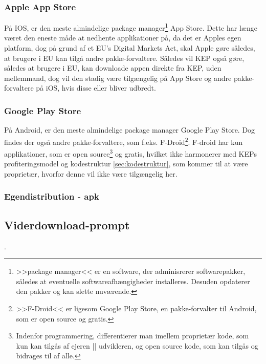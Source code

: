 \subsubsection{Apple App Store}
På IOS, er den meste almindelige package manager\footnote{>>package manager<< er en software, der adminisrerer softwarepakker, således at eventuelle softwareafhængigheder installeres. Desuden opdaterer den pakker og kan slette nuværende.} App Store. Dette har længe været den eneste måde at nedhente applikationer på, da det er Apples egen platform, dog på grund af et EU's Digital Markets Act, skal Apple gøre således, at brugere i EU kan tilgå andre pakke-forvaltere.\cite{appleDMA} Således vil KEP også gøre, således at brugere i EU, kan downloade appen direkte fra KEP, uden mellemmand, dog vil den stadig være tilgængelig på App Store og andre pakke-forvaltere på iOS, hvis disse eller bliver udbredt.

\subsubsection{Google Play Store}
På Android, er den meste almindelige package manager Google Play Store. Dog findes der også andre pakke-forvaltere, som f.eks. F-Droid\footnote{>>F-Droid<< er ligesom Google Play Store, en pakke-forvalter til Android, som er open source og gratis.\cite{F-Droid-wiki}}. F-droid har kun applikationer, som er open source\footnote{Indenfor programmering, differentierer man imellem proprietær kode, som kun kan tilgås af ejeren || udvikleren, og open source kode, som kan tilgås og bidrages til af alle.} og gratis, hvilket ikke harmonerer med KEPs profiteringsmodel og kodestruktur \ref{sec:kodestruktur}, som kommer til at være proprietær, hvorfor denne vil ikke være tilgængelig her. 

\subsubsection{Egendistribution - apk}


\subsection{Viderdownload-prompt}.
